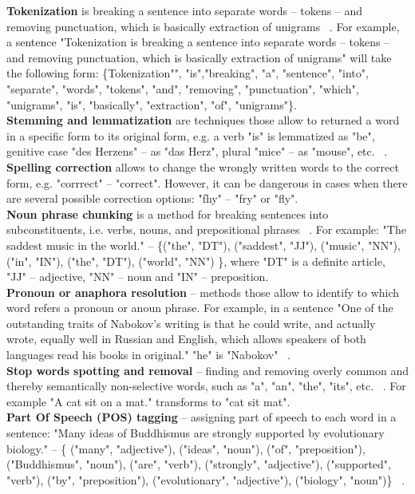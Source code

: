 \textbf{Tokenization} is breaking a sentence into separate words – tokens – and removing punctuation, which is basically extraction of unigrams ~\cite{token}. For example, a sentence "Tokenization is breaking a sentence into separate words – tokens – and removing punctuation, which is basically extraction of unigrams" will take the following form: \{Tokenization"", "is","breaking", "a", "sentence", "into", "separate", "words", "tokens", "and", "removing", "punctuation", "which", "unigrams", "is", "basically", "extraction", "of", "unigrams"\}. \\

\textbf{Stemming and lemmatization} are techniques those allow to returned a word in a specific form to its original form, e.g. a verb "is" is lemmatized as "be", genitive case "des Herzens" -- as "das Herz", plural "mice" -- as "mouse", etc. ~\cite{lemm}.\\

\textbf{Spelling correction} allows to change the wrongly written words to the correct form, e.g. "corrrect" -- "correct". However, it can be dangerous in cases when there are several possible correction options: "fhy" -- "fry" or "fly".\\

\textbf{Noun phrase chunking} is a method for breaking sentences into subconstituents, i.e. verbs, nouns, and prepositional phrases ~\cite{chunk}. For example: "The saddest music in the world." -- \{("the", "DT"), ("saddest", "JJ"), ("music", "NN"), ("in", "IN"), ("the", "DT"), ("world", "NN") \}, where "DT" is a definite article, "JJ" -- adjective, "NN" -- noun and "IN" -- preposition.\\

\textbf{Pronoun or anaphora resolution} -- methods those allow to identify to which word refers a pronoun or anoun phrase. For example, in a sentence "One of the outstanding traits of Nabokov's writing is that he could write, and actually wrote, equally well in Russian and English, which allows speakers of both languages read his books in original." "he" is "Nabokov" ~\cite{anaphora}.\\

\textbf{Stop words spotting and removal} -- finding and removing overly common and thereby semantically non-selective words, such as "a", "an", "the", "its", etc. ~\cite{stop}. For example "A cat sit on a mat." transforms to "cat sit mat".\\

\textbf{Part Of Speech (POS) tagging} -- assigning part of speech to each word in a sentence: "Many ideas of Buddhismus are strongly supported by evolutionary biology." -- \{ ("many", "adjective"), ("ideas", "noun"), ("of", "preposition"), ("Buddhismus", "noun"), ("are", "verb"), ("strongly", "adjective"), ("supported", "verb"), ("by", "preposition"), ("evolutionary", "adjective"),  ("biology", "noun")\} ~\cite{POS}.

